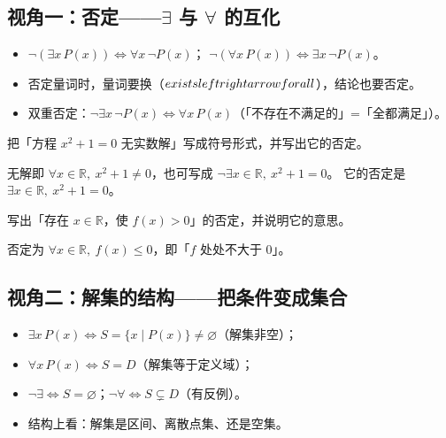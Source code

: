 \begin{explore}

\subsection{视角一：否定——$\exists$ 与 $\forall$ 的互化}

\begin{itemize}
  \item $\neg(\exists x\,P(x))\iff\forall x\,\neg P(x)$；
        $\neg(\forall x\,P(x))\iff\exists x\,\neg P(x)$。
  \item 否定量词时，量词要换（$\\exists \\leftrightarrow \\forall$），结论也要否定。
  \item 双重否定：$\neg\exists x\,\neg P(x)\iff\forall x\,P(x)$（「不存在不满足的」=「全都满足」）。
\end{itemize}

\begin{example}
把「方程 $x^2+1=0$ 无实数解」写成符号形式，并写出它的否定。
\end{example}
\begin{solution}
无解即 $\forall x\in\mathbb{R},\ x^2+1\neq0$，也可写成 $\neg\exists x\in\mathbb{R},\ x^2+1=0$。
它的否定是 $\exists x\in\mathbb{R},\ x^2+1=0$。
\end{solution}

\begin{problem}
写出「存在 $x\in\mathbb{R}$，使 $f(x)>0$」的否定，并说明它的意思。
\end{problem}
\begin{solution}
否定为 $\forall x\in\mathbb{R},\ f(x)\leq0$，即「$f$ 处处不大于 $0$」。
\end{solution}

\subsection{视角二：解集的结构——把条件变成集合}

\begin{itemize}
  \item $\exists x\,P(x)\iff S=\{x\mid P(x)\}\neq\varnothing$（解集非空）；
  \item $\forall x\,P(x)\iff S=D$（解集等于定义域）；
  \item $\neg\exists\iff S=\varnothing$；$\neg\forall\iff S\subsetneq D$（有反例）。
  \item 结构上看：解集是区间、离散点集、还是空集。
\end{itemize}


\end{explore}
